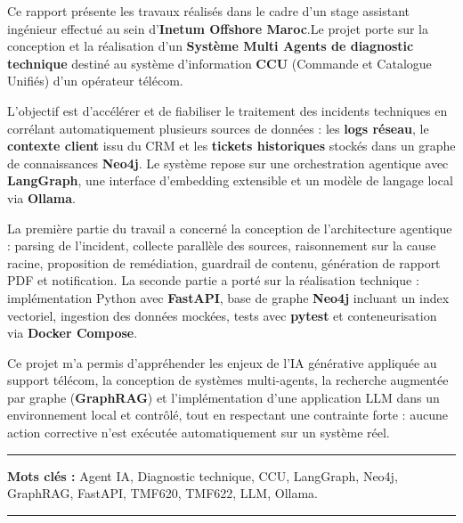 \resume
%
Ce rapport présente les travaux réalisés dans le cadre d'un stage assistant ingénieur effectué au sein d'\textbf{Inetum Offshore Maroc}.Le projet porte sur la conception et la réalisation d'un \textbf{Système Multi Agents de diagnostic technique} destiné au système d'information \textbf{CCU} (Commande et Catalogue Unifiés) d'un opérateur télécom.

\medskip

L'objectif est d'accélérer et de fiabiliser le traitement des incidents techniques en corrélant automatiquement plusieurs sources de données : les \textbf{logs réseau}, le \textbf{contexte client} issu du CRM et les \textbf{tickets historiques} stockés dans un graphe de connaissances \textbf{Neo4j}. Le système repose sur une orchestration agentique avec \textbf{LangGraph}, une interface d'embedding extensible et un modèle de langage local via \textbf{Ollama}.

\medskip

La première partie du travail a concerné la conception de l'architecture agentique : parsing de l'incident, collecte parallèle des sources, raisonnement sur la cause racine, proposition de remédiation, guardrail de contenu, génération de rapport PDF et notification. La seconde partie a porté sur la réalisation technique : implémentation Python avec \textbf{FastAPI}, base de graphe \textbf{Neo4j} incluant un index vectoriel, ingestion des données mockées, tests avec \textbf{pytest} et conteneurisation via \textbf{Docker Compose}.

\medskip

Ce projet m'a permis d'appréhender les enjeux de l'IA générative appliquée au support télécom, la conception de systèmes multi-agents, la recherche augmentée par graphe (\textbf{GraphRAG}) et l'implémentation d'une application LLM dans un environnement local et contrôlé, tout en respectant une contrainte forte : aucune action corrective n'est exécutée automatiquement sur un système réel.


\vspace{1cm}


\noindent\rule[2pt]{\textwidth}{0.5pt}

{\textbf{Mots clés :}}
Agent IA, Diagnostic technique, CCU, LangGraph, Neo4j, GraphRAG, FastAPI, TMF620, TMF622, LLM, Ollama.
\\
\noindent\rule[2pt]{\textwidth}{0.5pt}

\clearpage
